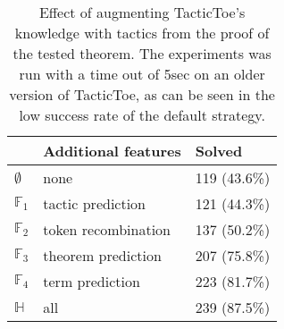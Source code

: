 \documentclass[runningheads,a4paper,draft]{svjour3}
\def\tactictoe{\textsf{TacticToe}\xspace}
\newcommand{\ra}[1]{\renewcommand{\arraystretch}{#1}}
\begin{document}
\begin{table}[h]
\centering\ra{1.3}
\small
\begin{tabular}{lll}
\toprule
 & Additional features & Solved \\
\midrule
$\emptyset$   & none & 119 (43.6\%) \\ %
$\mathbb{F}_1$& tactic prediction & 121 (44.3\%) \\ %
$\mathbb{F}_2$& token recombination  & 137 (50.2\%) \\ %
$\mathbb{F}_3$& theorem prediction  & 207 (75.8\%) \\ %
$\mathbb{F}_4$& term prediction & 223 (81.7\%) \\ %
$\mathbb{H}$  & all & 239 (87.5\%) \\ %
\bottomrule
\end{tabular}
\caption{\label{tab:featue_param} Effect of augmenting \tactictoe's knowledge 
with tactics from the proof of the tested theorem. The experiments was run with 
a time out of 5sec on an older version of \tactictoe, as can be seen in the low 
success rate of the
default strategy.} 
\end{table}
\end{document}
